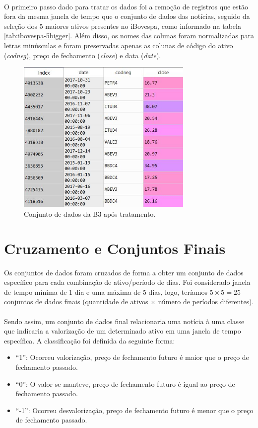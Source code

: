 \documentclass[grad,numbers]{coppe}
\begin{document}
  		\paragraph{}O primeiro passo dado para tratar os dados foi a remoção de registros que estão fora da mesma janela de tempo que o conjunto de dados das notícias, seguido da seleção dos 5 maiores ativos presentes no iBovespa, como informado na tabela \ref{tab:ibovespa-5bigger}. Além disso, os nomes das colunas foram normalizadas para letras minúsculas e foram preservadas apenas as colunas de código do ativo (\textit{codneg}), preço de fechamento (\textit{close}) e data (\textit{date}).
  		\begin{figure}[h]
  			\centering
  			{\includegraphics[width=8.5cm]{b3-pp-dataset}
  				\caption{Conjunto de dados da B3 após tratamento.}
  				\label{fig:b3-pp-dataset-fig}}
  		\end{figure}
  	\section{Cruzamento e Conjuntos Finais}\label{sec:cruzamento-e-conjuntos-finais}
  		\paragraph{}Os conjuntos de dados foram cruzados de forma a obter um conjunto de dados específico para cada combinação de ativo/período de dias. Foi considerado janela de tempo mínima de 1 dia e uma máxima de 5 dias, logo, teríamos $5\times5=25$ conjuntos de dados finais (quantidade de ativos $\times$ número de períodos diferentes).
  		\paragraph{}Sendo assim, um conjunto de dados final relacionaria uma notícia à uma classe que indicaria a valorização de um determinado ativo em uma janela de tempo específica. A classificação foi definida da seguinte forma:
 			\begin{itemize}
  			\item ``1'': Ocorreu valorização, preço de fechamento futuro é maior que o preço de fechamento passado.
	 			\item ``0'': O valor se manteve, preço de fechamento futuro é igual ao preço de fechamento passado.
	 			\item ``-1'': Ocorreu desvalorização, preço de fechamento futuro é menor que o preço de fechamento passado.
  		\end{itemize}
\end{document}

